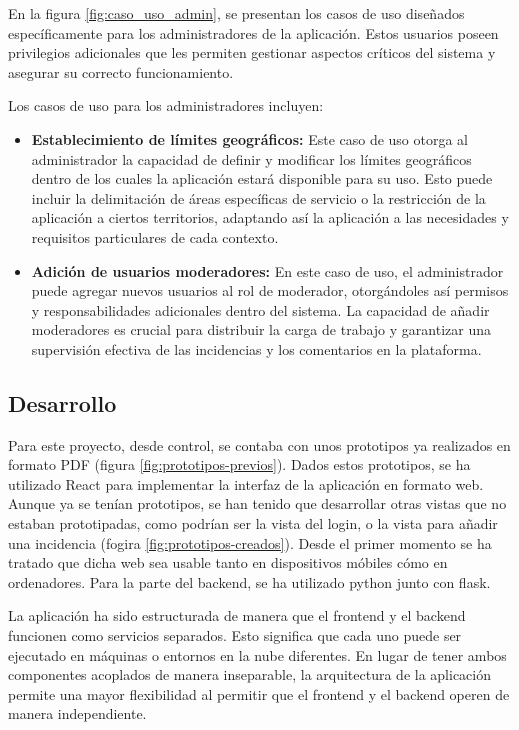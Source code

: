 \documentclass{article}
\begin{document}
En la figura \ref{fig:caso_uso_admin}, se presentan los casos de uso diseñados específicamente para los administradores de la aplicación. Estos usuarios poseen privilegios adicionales que les permiten gestionar aspectos críticos del sistema y asegurar su correcto funcionamiento.

Los casos de uso para los administradores incluyen:
\begin{itemize}
    \item \textbf{Establecimiento de límites geográficos:} Este caso de uso otorga al administrador la capacidad de definir y modificar los límites geográficos dentro de los cuales la aplicación estará disponible para su uso. Esto puede incluir la delimitación de áreas específicas de servicio o la restricción de la aplicación a ciertos territorios, adaptando así la aplicación a las necesidades y requisitos particulares de cada contexto.
    \item \textbf{Adición de usuarios moderadores:} En este caso de uso, el administrador puede agregar nuevos usuarios al rol de moderador, otorgándoles así permisos y responsabilidades adicionales dentro del sistema. La capacidad de añadir moderadores es crucial para distribuir la carga de trabajo y garantizar una supervisión efectiva de las incidencias y los comentarios en la plataforma.
\end{itemize}

\subsection{Desarrollo}

Para este proyecto, desde control, se contaba con unos prototipos ya realizados en formato PDF (figura \ref{fig:prototipos-previos}). Dados estos prototipos, se ha utilizado React para implementar la interfaz de la aplicación en formato web. Aunque ya se tenían prototipos, se han tenido que desarrollar otras vistas que no estaban prototipadas, como podrían ser la vista del login, o la vista para añadir una incidencia (fogira \ref{fig:prototipos-creados}). Desde el primer momento se ha tratado que dicha web sea usable tanto en dispositivos móbiles cómo en ordenadores. Para la parte del backend, se ha utilizado python junto con flask. 

La aplicación ha sido estructurada de manera que el frontend y el backend funcionen como servicios separados. Esto significa que cada uno puede ser ejecutado en máquinas o entornos en la nube diferentes. En lugar de tener ambos componentes acoplados de manera inseparable, la arquitectura de la aplicación permite una mayor flexibilidad al permitir que el frontend y el backend operen de manera independiente.
\end{document}
